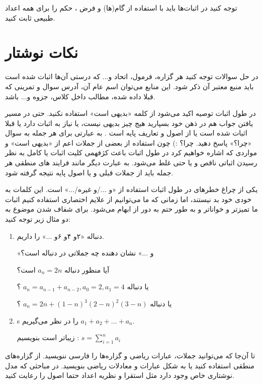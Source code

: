 \documentclass[11pt,largemargins]{h2wp}
\begin{document}
 	 توجه کنید در اثبات‌ها باید با استفاده از گام(ها) و فرض ، حکم را برای همه اعداد طبیعی ثابت کنید.
 
 
\chapter*{
نکات نوشتار}
\notes
{}
در حل سوالات توجه کنید هر گزاره، فرمول، اتحاد و... که درستی آن‌ها اثبات شده است  باید منبع معتبر آن ‌ذکر شود‌. این منابع می‌توان اسم عام آن، آدرس سوال و تمرینی که قبلا داده شده، مطالب داخل کلاس، جزوه و... باشد. 

در طول اثبات توصیه اکید می‌شود از کلمه «بدیهی است» استفاده نکنید. حتی در مسیر یافتن جواب هم در ذهن خود بسپارید هیج چیز بدیهی نیست، یا نیاز به اثبات دارد یا قبلا اثبات شده است یا از اصول و تعاریف پایه است 
.
به عبارتی برای هر جمله به سوال «چرا؟» پاسخ دهید.
چرا؟ :)
چون استفاده از بعضی از جملات اعم از «بدیهی است» و مواردی که اشاره خواهیم کرد در طول اثبات باعث کژفهمی کلیت اثبات یا کامل به نظر رسیدن اثباتی ناقص و یا حتی غلط می‌شود. 
به عبارت دیگر
مانند فرایند های منطقی
هر جمله باید از جملات قبلی و یا اصول پایه نتیجه گرفته شود.

یکی از چراغ خطرهای در طول اثبات استفاده از «و .../و غیره/...» است. این کلمات به خودی خود بد نیستند، اما زمانی که ما می‌توانیم از علایم اختصاری استفاده کنیم اثبات ما تمیزتر و خواناتر و به طور حتم به دور از ابهام می‌شود.
برای شفاف شدن موضوع به دو مثال زیر توجه کنید:

\begin{enumerate}
\item
دنباله «۲و ۴و ۶و ...» را داریم.

«و ...» نشان دهنده چه جملاتی در دنباله است؟

آیا منظور دنباله $a_n =2n $ است؟

یا دنباله $a_n = a_{n-1} + a_{n-2} ,  a_0=2 , a_1=4$ ؟

یا دنباله $ a_n = 2n + (1-n)^3(2-n)^2(3-n) $ ؟ 
\item
s
را در نظر می‌گیریم $ a_1 + a_2 + ... + a_n $. 

زیباتر است بنویسیم :
$ s = \sum_{i=1}^{n} {a_i} $

\end{enumerate}

تا آن‌جا که می‌توانید جملات، عبارات ریاضی و گزاره‌ها را فارسی ننویسید. از گزاره‌های منطقی استفاده کنید یا به شکل عبارات و معادلات ریاضی بنویسید. در مباحثی که مدل نوشتاری خاص وجود دارد مثل استقرا و نظریه اعداد حتما اصول را رعایت کنید.
\end{document}
